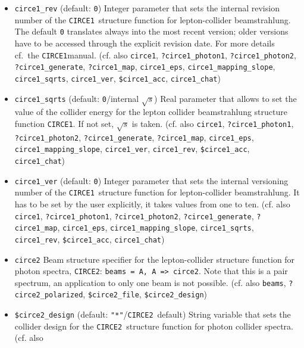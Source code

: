 \documentclass[12pt]{book}
\newcommand{\ttt}[1]{\texttt{#1}}
\newcommand{\circeone}{\texttt{CIRCE1}}
\newcommand{\circetwo}{\texttt{CIRCE2}}
\begin{document}
\begin{itemize}
\item
\ttt{circe1\_rev} \qquad (default: \ttt{0}) \newline
Integer parameter that sets the internal revision number of the
\circeone\ structure function for lepton-collider beamstrahlung. The
default \ttt{0} translates always into the most recent version; older
versions have to be accessed through the explicit revision date. For
more details cf.~the \circeone manual.
(cf. also \ttt{circe1}, \ttt{?circe1\_photon1},
\ttt{?circe1\_photon2},  \ttt{?circe1\_generate}, \ttt{?circe1\_map},
\ttt{circe1\_eps}, \ttt{circe1\_mapping\_slope},
\ttt{circe1\_sqrts}, \ttt{circe1\_ver}, \ttt{\$circe1\_acc},
\ttt{circe1\_chat}) 
\item
\ttt{circe1\_sqrts} \qquad (default: \ttt{0}/internal $\sqrt{s}$)
\newline 
Real parameter that allows to set the value of the collider energy for
the lepton collider beamstrahlung structure function \circeone. If not
set, $\sqrt{s}$ is taken. (cf. also \ttt{circe1}, \ttt{?circe1\_photon1},
\ttt{?circe1\_photon2},  \ttt{?circe1\_generate}, \ttt{?circe1\_map},
\ttt{circe1\_eps}, \newline \ttt{circe1\_mapping\_slope},
\ttt{circe1\_ver}, \ttt{circe1\_rev}, \ttt{\$circe1\_acc},
\ttt{circe1\_chat}) 
\item
\ttt{circe1\_ver} \qquad (default: \ttt{0}) \newline
Integer parameter that sets the internal versioning number of the
\circeone\ structure function for lepton-collider beamstrahlung. It
has to be set by the user explicitly, it takes values from one to ten.
(cf. also \ttt{circe1}, \ttt{?circe1\_photon1},
\ttt{?circe1\_photon2},  \ttt{?circe1\_generate}, \ttt{?circe1\_map},
\ttt{circe1\_eps}, \ttt{circe1\_mapping\_slope},
\ttt{circe1\_sqrts}, \ttt{circe1\_rev}, \ttt{\$circe1\_acc},
\ttt{circe1\_chat}) 
\item
\ttt{circe2} \newline
Beam structure specifier for the lepton-collider structure function
for photon spectra, \circetwo: \ttt{beams = A, A => circe2}. Note that
this is a pair spectrum, an application to only one beam is not
possible. (cf. also \ttt{beams}, \ttt{?circe2\_polarized},
\ttt{\$circe2\_file}, \ttt{\$circe2\_design})
\item
\ttt{\$circe2\_design} \qquad (default: \ttt{"*"}/\circetwo\ default)
\newline 
String variable that sets the collider design for the \circetwo\
structure function for photon collider spectra. (cf. also

\end{itemize}
\end{document}

